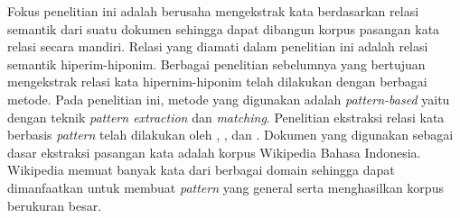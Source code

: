 Fokus penelitian ini adalah berusaha mengekstrak kata berdasarkan relasi semantik dari suatu dokumen sehingga dapat dibangun korpus pasangan kata relasi secara mandiri. Relasi yang diamati dalam penelitian ini adalah relasi semantik hiperim-hiponim. Berbagai penelitian sebelumnya yang bertujuan mengekstrak relasi kata hipernim-hiponim telah dilakukan dengan berbagai metode. Pada penelitian ini, metode yang digunakan adalah \textit{pattern-based} yaitu dengan teknik \textit{pattern extraction} dan \textit{matching}. Penelitian ekstraksi relasi kata berbasis \textit{pattern} telah dilakukan oleh \cite{hearst1992automatic}, \cite{ruiz2005automatic}, dan \cite{arnold2014extracting}. Dokumen yang digunakan sebagai dasar ekstraksi pasangan kata adalah korpus Wikipedia Bahasa Indonesia. Wikipedia memuat banyak kata dari berbagai domain sehingga dapat dimanfaatkan untuk membuat \textit{pattern} yang general serta menghasilkan korpus berukuran besar.
%
